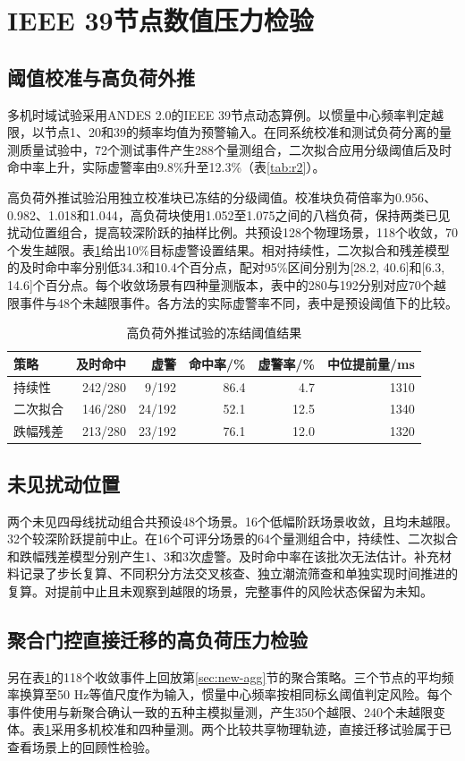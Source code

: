 \documentclass[UTF8,a4paper,11pt]{ctexart}
\begin{document}
\section{IEEE 39节点数值压力检验}
\subsection{阈值校准与高负荷外推}
多机时域试验采用ANDES 2.0的IEEE 39节点动态算例\cite{cui}。以惯量中心频率判定越限，以节点1、20和39的频率均值为预警输入。在同系统校准和测试负荷分离的量测质量试验中，72个测试事件产生288个量测组合，二次拟合应用分级阈值后及时命中率上升，实际虚警率由9.8\%升至12.3\%（表\ref{tab:r2}）。

高负荷外推试验沿用独立校准块已冻结的分级阈值。校准块负荷倍率为0.956、0.982、1.018和1.044，高负荷块使用1.052至1.075之间的八档负荷，保持两类已见扰动位置组合，提高较深阶跃的抽样比例。共预设128个物理场景，118个收敛，70个发生越限。表\ref{tab:r3}给出10\%目标虚警设置结果。相对持续性，二次拟合和残差模型的及时命中率分别低34.3和10.4个百分点，配对95\%区间分别为[28.2, 40.6]和[6.3, 14.6]个百分点。每个收敛场景有四种量测版本，表中的280与192分别对应70个越限事件与48个未越限事件。各方法的实际虚警率不同，表中是预设阈值下的比较。

\begin{table}[htbp]
\centering
\caption{高负荷外推试验的冻结阈值结果}\label{tab:r3}
\begin{tabular}{lrrrrr}
\toprule
策略 & 及时命中 & 虚警 & 命中率/\% & 虚警率/\% & 中位提前量/ms\\
\midrule
持续性 & 242/280 & 9/192 & 86.4 & 4.7 & 1310\\
二次拟合 & 146/280 & 24/192 & 52.1 & 12.5 & 1340\\
跌幅残差 & 213/280 & 23/192 & 76.1 & 12.0 & 1320\\
\bottomrule
\end{tabular}
\end{table}

\subsection{未见扰动位置}
两个未见四母线扰动组合共预设48个场景。16个低幅阶跃场景收敛，且均未越限。32个较深阶跃提前中止。在16个可评分场景的64个量测组合中，持续性、二次拟合和跌幅残差模型分别产生1、3和3次虚警。及时命中率在该批次无法估计。补充材料记录了步长复算、不同积分方法交叉核查、独立潮流筛查和单独实现时间推进的复算。对提前中止且未观察到越限的场景，完整事件的风险状态保留为未知。

\subsection{聚合门控直接迁移的高负荷压力检验}
另在表\ref{tab:r3}的118个收敛事件上回放第\ref{sec:new-agg}节的聚合策略。三个节点的平均频率换算至50 Hz等值尺度作为输入，惯量中心频率按相同标幺阈值判定风险。每个事件使用与新聚合确认一致的五种主模拟量测，产生350个越限、240个未越限变体。表\ref{tab:r3}采用多机校准和四种量测。两个比较共享物理轨迹，直接迁移试验属于已查看场景上的回顾性检验。
\end{document}
